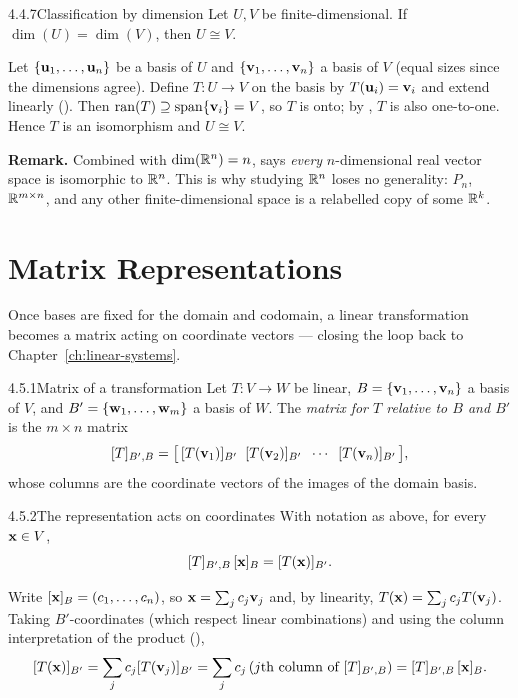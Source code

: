 \begin{thms}{4.4.7}{Classification by dimension}
Let $U,V$ be finite-dimensional. If $\dim(U)=\dim(V)$, then $U\cong V$.
\end{thms}

\begin{prf}
Let $\{\mathbf{u}_1,\dots,\mathbf{u}_n\}$ be a basis of $U$ and $\{\mathbf{v}_1,\dots,\mathbf{v}_n\}$ a basis of $V$ (equal sizes since the dimensions agree). Define $T:U\to V$ on the basis by $T(\mathbf{u}_i)=\mathbf{v}_i$ and extend linearly (). Then $\operatorname{ran}(T)\supseteq\operatorname{span}\{\mathbf{v}_i\}=V$, so $T$ is onto; by , $T$ is also one-to-one. Hence $T$ is an isomorphism and $U\cong V$.
\end{prf}

\begin{rmknote}
\textbf{Remark.}\; Combined with $\operatorname{dim}(\mathbb{R}^n)=n$,  says \emph{every} $n$-dimensional real vector space is isomorphic to $\mathbb{R}^n$. This is why studying $\mathbb{R}^n$ loses no generality: $P_n$, $\mathbb{R}^{m\times n}$, and any other finite-dimensional space is a relabelled copy of some $\mathbb{R}^k$.
\end{rmknote}

\section{Matrix Representations}
\label{sec:4.5}

Once bases are fixed for the domain and codomain, a linear transformation becomes a matrix acting on coordinate vectors --- closing the loop back to Chapter~\ref{ch:linear-systems}.

\begin{defns}{4.5.1}{Matrix of a transformation}
Let $T:V\to W$ be linear, $B=\{\mathbf{v}_1,\dots,\mathbf{v}_n\}$ a basis of $V$, and $B'=\{\mathbf{w}_1,\dots,\mathbf{w}_m\}$ a basis of $W$. The \emph{matrix for $T$ relative to $B$ and $B'$} is the $m\times n$ matrix
\[
[T]_{B',B}=\bigl[\,[T(\mathbf{v}_1)]_{B'}\;\;[T(\mathbf{v}_2)]_{B'}\;\;\cdots\;\;[T(\mathbf{v}_n)]_{B'}\,\bigr],
\]
whose columns are the coordinate vectors of the images of the domain basis.
\end{defns}

\begin{thms}{4.5.2}{The representation acts on coordinates}
With notation as above, for every $\mathbf{x}\in V$,
\[
[T]_{B',B}\,[\mathbf{x}]_B=[T(\mathbf{x})]_{B'}.
\]
\end{thms}

\begin{prf}
Write $[\mathbf{x}]_B=(c_1,\dots,c_n)$, so $\mathbf{x}=\sum_j c_j\mathbf{v}_j$ and, by linearity, $T(\mathbf{x})=\sum_j c_jT(\mathbf{v}_j)$. Taking $B'$-coordinates (which respect linear combinations) and using the column interpretation of the product (),
\[
[T(\mathbf{x})]_{B'}=\sum_j c_j[T(\mathbf{v}_j)]_{B'}=\sum_j c_j\,(\text{$j$th column of }[T]_{B',B})=[T]_{B',B}\,[\mathbf{x}]_B.
\]
\end{prf}

